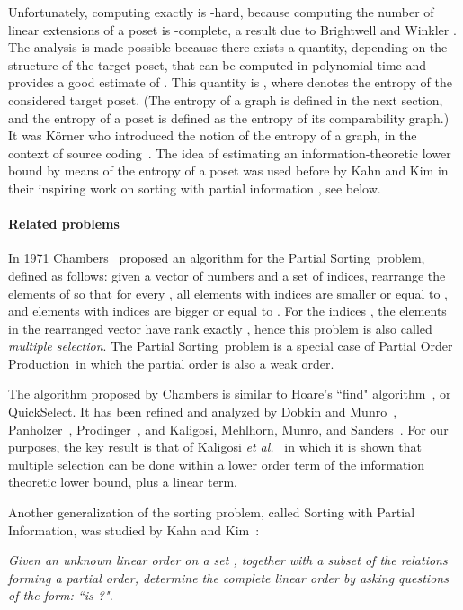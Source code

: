 \documentclass[12pt,oneside]{article}
\newcommand{\partsort}{{\sc Partial Order Production}}
\newcommand{\psort}{{\sc Partial Sorting}}
\newcommand{\sortwpi}{{\sc Sorting with Partial Information}}
\begin{document}
Unfortunately, computing  exactly is -hard, because computing the number of linear extensions of a poset is -complete, a result due to Brightwell and Winkler \cite{BW91}. The analysis is made possible because there exists a quantity, depending on the structure of the target poset, that can be computed in polynomial time and provides a good estimate of . This quantity is , where  denotes the entropy of the considered target poset. (The entropy of a graph is defined in the next section, and the entropy of a poset is defined as the entropy of its comparability graph.) It was K\"orner who introduced the notion of the entropy of a graph, in the context of source coding~\cite{K73}. The idea of estimating an information-theoretic lower bound by means of the entropy of a poset was used before by Kahn and Kim in their inspiring work on sorting with partial information \cite{KK95}, see below.

\paragraph{Related problems}
In 1971 Chambers~\cite{C71} proposed an algorithm for the \psort\ problem, defined as follows: given a vector  of  numbers and a set  of indices, rearrange the elements of  so that for every , all elements with indices  are smaller or equal to , and elements with indices  are bigger or equal to . For the indices , the elements  in the rearranged vector have rank exactly , hence this problem is also called {\em multiple selection}. The \psort\ problem is a special case of \partsort\ in which the partial order is also a weak order.

The algorithm proposed by Chambers is similar to Hoare's ``find" algorithm~\cite{H61}, or QuickSelect. It has been refined and analyzed by Dobkin and Munro~\cite{DM81}, Panholzer~\cite{Pa03}, Prodinger~\cite{Pr03}, and Kaligosi, Mehlhorn, Munro, and Sanders~\cite{KMMS05}. For our purposes, the key result is that of Kaligosi {\em et al.\/}~\cite{KMMS05} in which it is shown that multiple selection can be done within a lower order term of the information theoretic lower bound, plus a linear term.\medskip

Another generalization of the sorting problem, called \sortwpi, was studied by Kahn and Kim~\cite{KK95}:\smallskip

{\it Given an unknown linear order  on a set , together with a subset  of the relations  forming a partial order, determine the complete linear order  by asking questions of the form: ``is ?".}\smallskip
\end{document}
